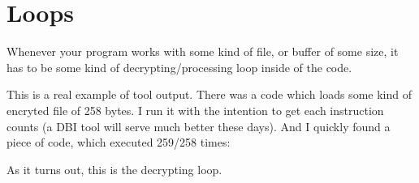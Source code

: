 \section{Loops}

Whenever your program works with some kind of file, or buffer of some size,
it has to be some kind of decrypting/processing loop inside of the code.

This is a real example of \tracer tool output.
There was a code which loads some kind of encryted file of 258 bytes.
I run it with the intention to get each instruction counts (a \ac{DBI} tool will serve much better these days).
And I quickly found a piece of code, which executed 259/258 times:



As it turns out, this is the decrypting loop.

